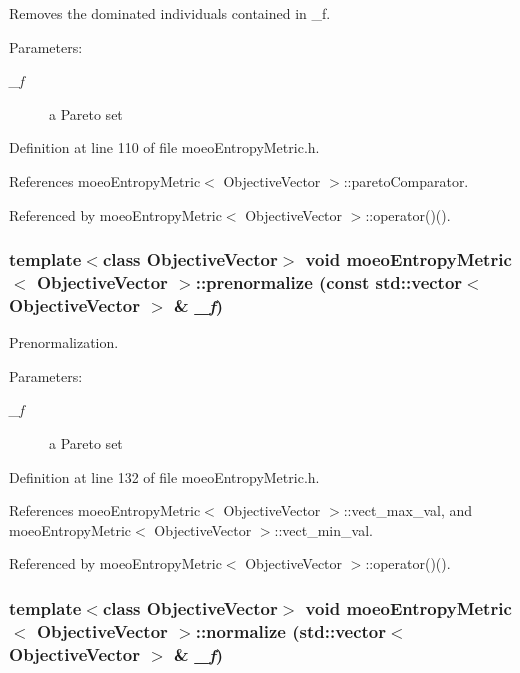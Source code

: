 Removes the dominated individuals contained in \_\-f. 

\begin{Desc}
\item[Parameters:]
\begin{description}
\item[{\em \_\-f}]a Pareto set \end{description}
\end{Desc}


Definition at line 110 of file moeo\-Entropy\-Metric.h.

References moeo\-Entropy\-Metric$<$ Objective\-Vector $>$::pareto\-Comparator.

Referenced by moeo\-Entropy\-Metric$<$ Objective\-Vector $>$::operator()().
\subsubsection{\setlength{\rightskip}{0pt plus 5cm}template$<$class Objective\-Vector$>$ void \bf{moeo\-Entropy\-Metric}$<$ Objective\-Vector $>$::prenormalize (const std::vector$<$ Objective\-Vector $>$ \& {\em \_\-f})\hspace{0.3cm}{\tt  [inline, private]}}\label{classmoeoEntropyMetric_51dd04bdd0ac6315f4f5956fb726cec1}


Prenormalization. 

\begin{Desc}
\item[Parameters:]
\begin{description}
\item[{\em \_\-f}]a Pareto set \end{description}
\end{Desc}


Definition at line 132 of file moeo\-Entropy\-Metric.h.

References moeo\-Entropy\-Metric$<$ Objective\-Vector $>$::vect\_\-max\_\-val, and moeo\-Entropy\-Metric$<$ Objective\-Vector $>$::vect\_\-min\_\-val.

Referenced by moeo\-Entropy\-Metric$<$ Objective\-Vector $>$::operator()().
\subsubsection{\setlength{\rightskip}{0pt plus 5cm}template$<$class Objective\-Vector$>$ void \bf{moeo\-Entropy\-Metric}$<$ Objective\-Vector $>$::normalize (std::vector$<$ Objective\-Vector $>$ \& {\em \_\-f})\hspace{0.3cm}{\tt  [inline, private]}}\label{classmoeoEntropyMetric_2ed5771c3c611634b415f4be48cad172}


